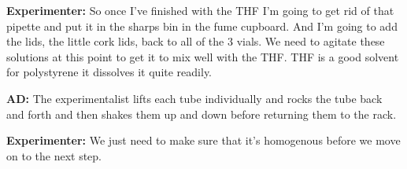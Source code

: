 \documentclass[11.5pt]{sig-alternate} %
\begin{document}
\begin{large}
\textbf{Experimenter:}  So once I've finished with the THF I'm going to get rid of that pipette and put it in the sharps bin in the fume cupboard. And I'm going to add the lids, the little cork lids, back to all of the 3 vials. We need to agitate these solutions at this point to get it to mix well with the THF. THF is a good solvent for polystyrene it dissolves it quite readily. 

\textbf{AD:} The experimentalist lifts each tube individually and rocks the tube back and forth and then shakes them up and down before returning them to the rack. 

\textbf{Experimenter:}  We just need to make sure that it's homogenous before we move on to the next step.
    
\end{large}
\end{document}
